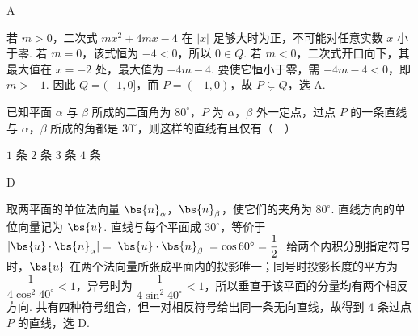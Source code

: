 \begin{answer}
A
\end{answer}

\begin{solution}
若 \(m>0\)，二次式 \(mx^2+4mx-4\) 在 \(|x|\) 足够大时为正，不可能对任意实数 \(x\) 小于零. 若 \(m=0\)，该式恒为 \(-4<0\)，所以 \(0\in Q\). 若 \(m<0\)，二次式开口向下，其最大值在 \(x=-2\) 处，最大值为 \(-4m-4\). 要使它恒小于零，需 \(-4m-4<0\)，即 \(m>-1\). 因此 \(Q=(-1,0]\)，而 \(P=(-1,0)\)，故 \(P\subsetneq Q\)，选 A.
\end{solution}

\begin{problem}
已知平面 \(\alpha\) 与 \(\beta\) 所成的二面角为 \(80^{\circ}\)，\(P\) 为 \(\alpha\)，\(\beta\) 外一定点，过点 \(P\) 的一条直线与 \(\alpha\)，\(\beta\) 所成的角都是 \(30^{\circ}\)，则这样的直线有且仅有（\(\quad\)）

\choices
    {\(1\) 条}
    {\(2\) 条}
    {\(3\) 条}
    {\(4\) 条}
\end{problem}

\begin{answer}
D
\end{answer}

\begin{solution}
取两平面的单位法向量 \(\bs{n}_\alpha\)，\(\bs{n}_\beta\)，使它们的夹角为 \(80^{\circ}\). 直线方向的单位向量记为 \(\bs{u}\). 直线与每个平面成 \(30^{\circ}\)，等价于 \(|\bs{u}\cdot\bs{n}_\alpha|=|\bs{u}\cdot\bs{n}_\beta|=\cos60^{\circ}=\dfrac12\). 给两个内积分别指定符号时，\(\bs{u}\) 在两个法向量所张成平面内的投影唯一；同号时投影长度的平方为 \(\dfrac{1}{4\cos^2 40^{\circ}}<1\)，异号时为 \(\dfrac{1}{4\sin^2 40^{\circ}}<1\)，所以垂直于该平面的分量均有两个相反方向. 共有四种符号组合，但一对相反符号给出同一条无向直线，故得到 \(4\) 条过点 \(P\) 的直线，选 D.
\end{solution}

